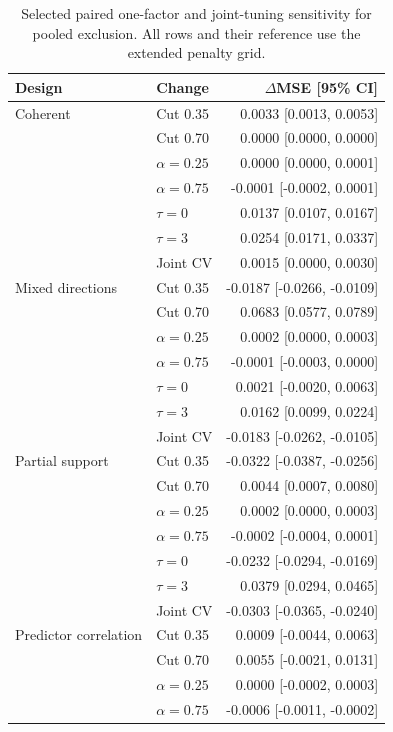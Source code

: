 \documentclass[11pt,a4paper]{article}
\begin{document}
\begin{table}[htbp]
\centering\small
\caption{Selected paired one-factor and joint-tuning sensitivity for pooled exclusion. All rows and their reference use the extended penalty grid.}
\label{tab:learned-tuning-sensitivity}
\begin{tabular}{llr}
\toprule
Design & Change & $\Delta$MSE [95\% CI] \\
\midrule
Coherent & Cut 0.35 & 0.0033 [0.0013, 0.0053] \\
 & Cut 0.70 & 0.0000 [0.0000, 0.0000] \\
 & $\alpha=0.25$ & 0.0000 [0.0000, 0.0001] \\
 & $\alpha=0.75$ & -0.0001 [-0.0002, 0.0001] \\
 & $\tau=0$ & 0.0137 [0.0107, 0.0167] \\
 & $\tau=3$ & 0.0254 [0.0171, 0.0337] \\
 & Joint CV & 0.0015 [0.0000, 0.0030] \\
\addlinespace
Mixed directions & Cut 0.35 & -0.0187 [-0.0266, -0.0109] \\
 & Cut 0.70 & 0.0683 [0.0577, 0.0789] \\
 & $\alpha=0.25$ & 0.0002 [0.0000, 0.0003] \\
 & $\alpha=0.75$ & -0.0001 [-0.0003, 0.0000] \\
 & $\tau=0$ & 0.0021 [-0.0020, 0.0063] \\
 & $\tau=3$ & 0.0162 [0.0099, 0.0224] \\
 & Joint CV & -0.0183 [-0.0262, -0.0105] \\
\addlinespace
Partial support & Cut 0.35 & -0.0322 [-0.0387, -0.0256] \\
 & Cut 0.70 & 0.0044 [0.0007, 0.0080] \\
 & $\alpha=0.25$ & 0.0002 [0.0000, 0.0003] \\
 & $\alpha=0.75$ & -0.0002 [-0.0004, 0.0001] \\
 & $\tau=0$ & -0.0232 [-0.0294, -0.0169] \\
 & $\tau=3$ & 0.0379 [0.0294, 0.0465] \\
 & Joint CV & -0.0303 [-0.0365, -0.0240] \\
\addlinespace
Predictor correlation & Cut 0.35 & 0.0009 [-0.0044, 0.0063] \\
 & Cut 0.70 & 0.0055 [-0.0021, 0.0131] \\
 & $\alpha=0.25$ & 0.0000 [-0.0002, 0.0003] \\
 & $\alpha=0.75$ & -0.0006 [-0.0011, -0.0002] \\

\end{tabular}
\end{table}
\end{document}
